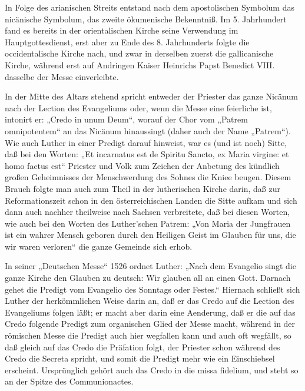 In Folge des arianischen Streits entstand nach dem apostolischen Symbolum das nicänische Symbolum, das zweite ökumenische Bekenntniß. Im 5. Jahrhundert fand es bereits in der orientalischen Kirche seine Verwendung im Hauptgottesdienst, erst aber zu Ende des 8. Jahrhunderts folgte die occidentalische Kirche nach, und zwar in derselben zuerst die gallicanische Kirche, während erst auf Andringen Kaiser Heinrichs Papst Benedict VIII. dasselbe der Messe einverleibte.

In der Mitte des Altars stehend spricht entweder der Priester das ganze Nicänum nach der Lection des Evangeliums oder, wenn die Messe eine feierliche ist, intonirt er: „Credo in unum Deum“, worauf der Chor vom „Patrem omnipotentem“ an das Nicänum hinaussingt (daher auch der Name „Patrem“). Wie auch Luther in einer Predigt darauf hinweist, war es (und ist noch) Sitte, daß bei den Worten: „Et incarnatus est de Spiritu Sancto, ex Maria virgine: et homo factus est“ Priester und Volk zum Zeichen der Anbetung des kündlich großen Geheimnisses der Menschwerdung des Sohnes die Kniee beugen. Diesem Brauch folgte man auch zum Theil in der lutherischen Kirche darin, daß zur Reformationszeit schon in den österreichischen Landen die Sitte aufkam und sich dann auch nachher theilweise nach Sachsen verbreitete, daß bei diesen Worten, wie auch bei den Worten des Luther’schen Patrem: „Von Maria der Jungfrauen ist ein wahrer Mensch geboren durch den Heiligen Geist im Glauben für uns, die wir waren verloren“ die ganze Gemeinde sich erhob.

In seiner „Deutschen Messe“ 1526 ordnet Luther: „Nach dem Evangelio singt die ganze Kirche den Glauben zu deutsch: Wir glauben all an einen Gott. Darnach gehet die Predigt vom Evangelio des Sonntags oder Festes.“ Hiernach schließt sich Luther der herkömmlichen Weise darin an, daß er das Credo auf die Lection des Evangeliums folgen läßt; er macht aber darin eine Aenderung, daß er die auf das Credo folgende Predigt zum organischen Glied der Messe macht, während in der römischen Messe die Predigt auch hier wegfallen kann und auch oft wegfällt, so daß gleich auf das Credo die Präfation folgt, der Priester schon während des Credo die Secreta spricht, und somit die Predigt mehr wie ein Einschiebsel erscheint. Ursprünglich gehört auch das Credo in die missa fidelium, und steht so an der Spitze des Communionactes.


